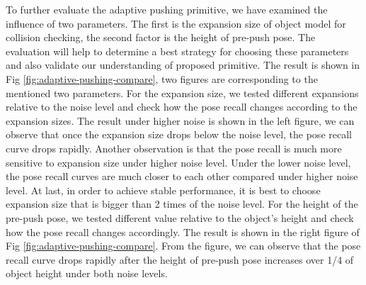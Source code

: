 {%




To further evaluate the adaptive pushing primitive, we have examined the influence of two parameters. The first is the expansion size of object model for collision checking, the second factor is the height of pre-push pose. The evaluation will help to determine a best strategy for choosing these parameters and also validate our understanding of proposed primitive. The result is shown in Fig \ref{fig:adaptive-pushing-compare}, two figures are corresponding to the mentioned two parameters. For the expansion size, we tested different expansions relative to the noise level and check how the pose recall changes according to the expansion sizes.  The result under higher noise is shown in the left figure, we can observe that once the expansion size drops below the noise level, the pose recall curve drops rapidly. Another observation is that the pose recall is much more sensitive to expansion size under higher noise level. Under the lower noise level, the pose recall curves are much closer to each other compared under higher noise level. At last, in order to achieve stable performance, it is best to choose expansion size that is bigger than 2 times of the noise level. 
For the height of the pre-push pose, we tested different value relative to the object's height and check how the pose recall changes accordingly. The result is shown in the right figure of Fig \ref{fig:adaptive-pushing-compare}. From the figure, we can observe that the pose recall curve drops rapidly after the height of pre-push pose increases over 1/4 of object height under both noise levels. 

}

